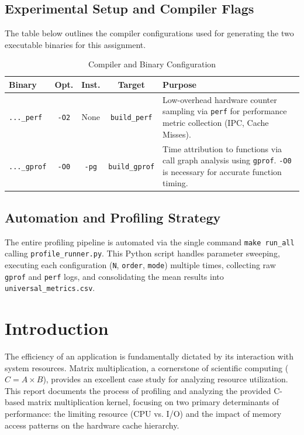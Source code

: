 \documentclass[11pt, a4paper]{article}
\begin{document}
\subsection{Experimental Setup and Compiler Flags}
The table below outlines the compiler configurations used for generating the two executable binaries for this assignment.

\begin{table}[h]
\centering
\caption{Compiler and Binary Configuration}
\label{tab:compiler_config}
\begin{tabularx}{\textwidth}{l c c c X}
\toprule
\textbf{Binary} & \textbf{Opt.} & \textbf{Inst.} & \textbf{Target} & \textbf{Purpose} \\
\midrule
\texttt{...\_perf} & \texttt{-O2} & None & \texttt{build\_perf} & Low-overhead hardware counter sampling via \texttt{perf} for performance metric collection (IPC, Cache Misses). \\
\texttt{...\_gprof} & \texttt{-O0} & \texttt{-pg} & \texttt{build\_gprof} & Time attribution to functions via call graph analysis using \texttt{gprof}. \texttt{-O0} is necessary for accurate function timing. \\
\bottomrule
\end{tabularx}
\end{table}

\subsection{Automation and Profiling Strategy}
The entire profiling pipeline is automated via the single command \texttt{make run\_all} calling \texttt{profile\_runner.py}. This Python script handles parameter sweeping, executing each configuration (\texttt{N}, \texttt{order}, \texttt{mode}) multiple times, collecting raw \texttt{gprof} and \texttt{perf} logs, and consolidating the mean results into \texttt{universal\_metrics.csv}.

\section{Introduction}
The efficiency of an application is fundamentally dictated by its interaction with system resources. Matrix multiplication, a cornerstone of scientific computing ($C=A \times B$), provides an excellent case study for analyzing resource utilization. This report documents the process of profiling and analyzing the provided C-based matrix multiplication kernel, focusing on two primary determinants of performance: the limiting resource (CPU vs. I/O) and the impact of memory access patterns on the hardware cache hierarchy.
\end{document}
